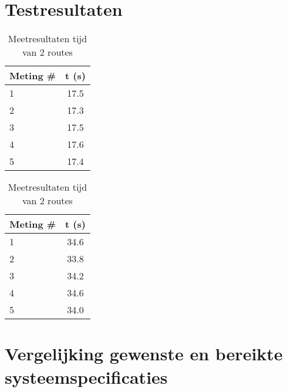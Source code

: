 \documentclass{report}
\begin{document}
\section{Testresultaten}
\begin{table}
	\centering
	\label{tab:measurementtime}
	\begin{subtable}[H]{0.40\textwidth}
		\centering
			\begin{tabular}{| l| c|}
		\hline
		   Meting \# & t (s) \\
		\hline
		   1& 17.5 \\
		\hline
		   2& 17.3 \\
		\hline
		   3& 17.5 \\
		\hline
		   4& 17.6 \\
		\hline
		   5& 17.4 \\
		\hline
		\end{tabular}
	\end{subtable}
	\quad
	\begin{subtable}[H]{0.40\textwidth}
		\centering
		\begin{tabular}{| l| c|}
		\hline
		   Meting \# & t (s) \\
		\hline
		   1& 34.6\\
		\hline
		   2& 33.8\\
		\hline
		   3& 34.2\\
		\hline
		  4& 34.6\\
		\hline
		   5& 34.0 \\
		\hline
		\end{tabular}
	\end{subtable}
	\caption{Meetresultaten tijd van 2 routes}
\end{table}

\section{Vergelijking gewenste en bereikte systeemspecificaties}
\end{document}
